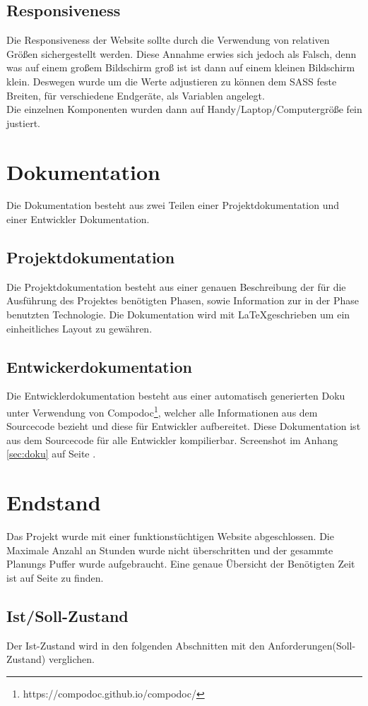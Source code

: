 \documentclass[11pt,a4paper]{article}
\begin{document}
\subsection{Responsiveness}
Die Responsiveness der Website sollte durch die Verwendung von relativen Größen sichergestellt werden. Diese Annahme erwies sich jedoch als Falsch, denn was auf einem großem Bildschirm groß ist ist dann auf einem kleinen Bildschirm klein. Deswegen wurde um die Werte adjustieren zu können dem \acs{SASS} feste Breiten, für verschiedene Endgeräte, als Variablen angelegt.\\Die einzelnen Komponenten wurden dann auf Handy/Laptop/Computergröße fein justiert.  
\section{Dokumentation}
Die Dokumentation besteht aus zwei Teilen einer Projektdokumentation und einer Entwickler Dokumentation.
\subsection{Projektdokumentation}
Die Projektdokumentation besteht aus einer genauen Beschreibung der für die Ausführung des Projektes benötigten Phasen, sowie Information zur in der Phase benutzten Technologie.
Die Dokumentation wird mit \LaTeX geschrieben um ein einheitliches Layout zu gewähren.
\subsection{Entwickerdokumentation}
Die Entwicklerdokumentation besteht aus einer automatisch generierten Doku unter Verwendung von Compodoc\footnote{https://compodoc.github.io/compodoc/}, welcher alle Informationen aus dem Sourcecode bezieht und diese für Entwickler aufbereitet. Diese Dokumentation ist aus dem Sourcecode für alle Entwickler kompilierbar. Screenshot im Anhang \ref{sec:doku} auf Seite \pageref{sec:doku}.
\section{Endstand}
Das Projekt wurde mit einer funktionstüchtigen Website abgeschlossen.  Die Maximale Anzahl an Stunden wurde nicht überschritten und der gesammte Planungs Puffer wurde aufgebraucht. Eine genaue Übersicht der Benötigten Zeit ist auf Seite \pageref{sec:time} zu finden.
\subsection{Ist/Soll-Zustand}
Der Ist-Zustand wird in den folgenden Abschnitten mit den Anforderungen(Soll-Zustand) verglichen.
\end{document}

